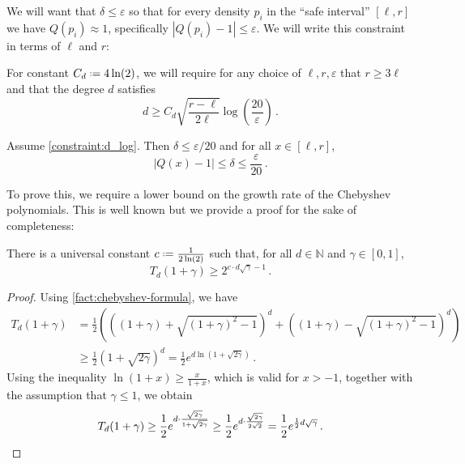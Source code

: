 \documentclass{theoretics}
\newcommand*{\define}{\mathrel{\vcenter{\baselineskip0.5ex \lineskiplimit0pt
                      \hbox{\scriptsize.}\hbox{\scriptsize.}}}%
                      =}
\newcommand{\bN}{\ensuremath{\mathbb{N}}}
\renewcommand{\epsilon}{\varepsilon}
\begin{document}
We will want that $\delta \leq \epsilon$ so that for every density $p_i$ in the ``safe interval''
$[\ell, r]$ we have $Q(p_i) \approx 1$, specifically $|Q(p_i) - 1| \leq \epsilon$. We will write this
constraint in terms of $\ell$ and $r$:

\begin{constraint}
\label{constraint:d_log}
For constant $C_d \define 4\ln(2)$, we will require for any choice of $\ell, r, \epsilon$
that $r \ge 3\ell$ and that the degree $d$ satisfies
\[
  d \geq C_d \sqrt{\frac{r-\ell}{2\ell}} \log \left(\frac{20}{\epsilon} \right) \,.
\]
\end{constraint}

\begin{proposition}
\label{res:d_log}
Assume \cref{constraint:d_log}. Then $\delta \leq \epsilon/20$ and for all $x \in [\ell, r]$,
\[
    | Q(x) - 1 | \leq \delta \le \frac{\epsilon}{20} \,.
\]
\end{proposition}

To prove this, we require a lower bound on the growth rate of the Chebyshev polynomials. This is well
known but we provide a proof for the sake of completeness:

\begin{proposition}
\label{res:cheb-tail-lb}
There is a universal constant $c \define \frac{1}{2\ln(2)}$ such that, for all $d \in \bN$ and
$\gamma \in [0,1]$,
\[
  T_d(1 + \gamma) \geq 2^{c \cdot d \sqrt \gamma - 1} \,.
\]
\end{proposition}
\begin{proof}
    Using \cref{fact:chebyshev-formula}, we have
    \begin{align*}
        T_d(1+\gamma)
        &= \frac{1}{2} \left( \left((1+\gamma) + \sqrt{(1+\gamma)^2-1}\right)^d
            + \left((1+\gamma) - \sqrt{(1+\gamma)^2-1}\right)^d \right) \\
        &\ge \frac{1}{2} \left( 1 + \sqrt{2\gamma} \right)^d
        = \frac{1}{2} e^{d \ln(1 + \sqrt{2\gamma})} \,.
    \end{align*}
    Using the inequality $\ln(1+x) \ge \frac{x}{1+x}$, which is valid for $x > -1$, together with
    the assumption that $\gamma \le 1$, we obtain
    \[
        T_d(1+\gamma)
        \ge \frac{1}{2} e^{d \cdot \frac{\sqrt{2\gamma}}{1 + \sqrt{2\gamma}}}
        \ge \frac{1}{2} e^{d \cdot \frac{\sqrt{2\gamma}}{2\sqrt{2}}}
        = \frac{1}{2} e^{\frac{1}{2} d \sqrt{\gamma}} \,. \qedhere
    \]
\end{proof}
\end{document}
